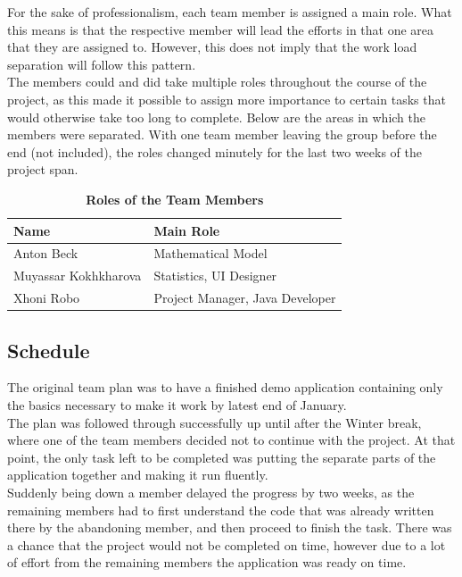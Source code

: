 \documentclass[hidelinks,conference,12pt]{IEEETran}
\begin{document}
For the sake of professionalism, each team member is assigned a main role. What this means is that the respective member will lead the efforts in that one area that they are assigned to. However, this does not imply that the work load separation will follow this pattern. \\
The members could and did take multiple roles throughout the course of the project, as this made it possible to assign more importance to certain tasks that would otherwise take too long to complete. Below are the areas in which the members were separated. With one team member leaving the group before the end (not included), the roles changed minutely for the last two weeks of the project span. 
\FloatBarrier
\begin{table}[h]
	\centering
	\caption{\textbf{Roles of the Team Members}}
	{\renewcommand{\arraystretch}{2}%
		\begin{tabular}{ | l | l | }
			\hline
			\textbf{Name} & \textbf{Main Role} \\ \hline
			Anton Beck & Mathematical Model \\ \hline
			Muyassar Kokhkharova & Statistics, UI Designer \\ \hline
			Xhoni Robo & Project Manager, Java Developer \\ \hline 
	\end{tabular}}
\end{table}

\subsection{Schedule}
The original team plan was to have a finished demo application containing only the basics necessary to make it work by latest end of January. \\
The plan was followed through successfully up until after the Winter break, where one of the team members decided not to continue with the project. At that point, the only task left to be completed was putting the separate parts of the application together and making it run fluently.\\
 Suddenly being down a member delayed the progress by two weeks, as the remaining members had to first understand the code that was already written there by the abandoning member, and then proceed to finish the task. There was a chance that the project would not be completed on time, however due to a lot of effort from the remaining members the application was ready on time. 

\clearpage
\FloatBarrier
\end{document}
